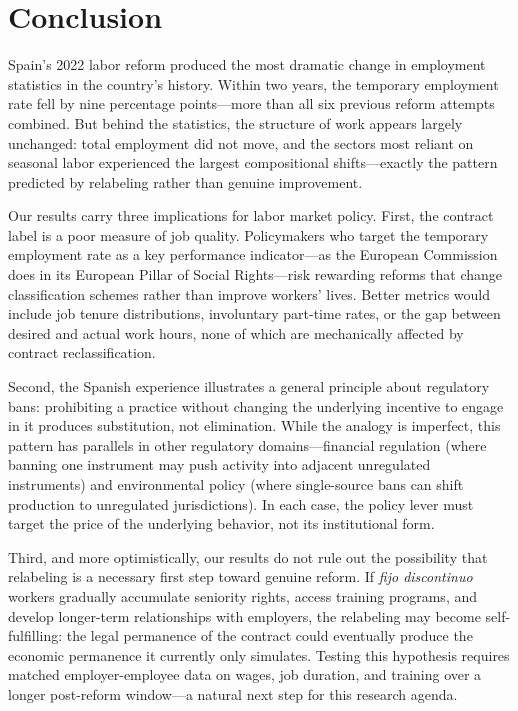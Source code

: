 \documentclass[12pt]{article}
\begin{document}
\section{Conclusion}
\label{sec:conclusion}

Spain's 2022 labor reform produced the most dramatic change in employment statistics in the country's history. Within two years, the temporary employment rate fell by nine percentage points---more than all six previous reform attempts combined. But behind the statistics, the structure of work appears largely unchanged: total employment did not move, and the sectors most reliant on seasonal labor experienced the largest compositional shifts---exactly the pattern predicted by relabeling rather than genuine improvement.

Our results carry three implications for labor market policy. First, the contract label is a poor measure of job quality. Policymakers who target the temporary employment rate as a key performance indicator---as the European Commission does in its European Pillar of Social Rights---risk rewarding reforms that change classification schemes rather than improve workers' lives. Better metrics would include job tenure distributions, involuntary part-time rates, or the gap between desired and actual work hours, none of which are mechanically affected by contract reclassification.

Second, the Spanish experience illustrates a general principle about regulatory bans: prohibiting a practice without changing the underlying incentive to engage in it produces substitution, not elimination. While the analogy is imperfect, this pattern has parallels in other regulatory domains---financial regulation (where banning one instrument may push activity into adjacent unregulated instruments) and environmental policy (where single-source bans can shift production to unregulated jurisdictions). In each case, the policy lever must target the price of the underlying behavior, not its institutional form.

Third, and more optimistically, our results do not rule out the possibility that relabeling is a necessary first step toward genuine reform. If \emph{fijo discontinuo} workers gradually accumulate seniority rights, access training programs, and develop longer-term relationships with employers, the relabeling may become self-fulfilling: the legal permanence of the contract could eventually produce the economic permanence it currently only simulates. Testing this hypothesis requires matched employer-employee data on wages, job duration, and training over a longer post-reform window---a natural next step for this research agenda.
\end{document}
